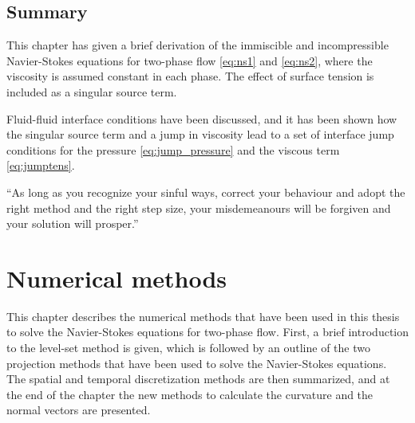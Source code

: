 \documentclass[11pt,b5paper,DIV=calc,BCOR1.3cm,headings=small,%
               footinclude=false,headsepline]{scrbook}
\begin{document}
\section{Summary}
This chapter has given a brief derivation of the immiscible and incompressible
Navier-Stokes equations for two-phase flow \eqref{eq:ns1} and \eqref{eq:ns2},
where the viscosity is assumed constant in each phase.  The effect of surface
tension is included as a singular source term.

Fluid-fluid interface conditions have been discussed, and it has been shown how
the singular source term and a jump in viscosity lead to a set of interface
jump conditions for the pressure \eqref{eq:jump_pressure} and the viscous term
\eqref{eq:jumptens}.

\begin{savequote}[7cm]
  ``As long as you recognize your sinful ways, correct your behaviour and adopt
  the right method and the right step size, your misdemeanours will be forgiven
  and your solution will prosper.''
\end{savequote}
\chapter{Numerical methods}
\label{chap:numerical-methods}
This chapter describes the numerical methods that have been used in this thesis
to solve the Navier-Stokes equations for two-phase flow.  First, a brief
introduction to the level-set method is given, which is followed by an outline
of the two projection methods that have been used to solve the Navier-Stokes
equations.  The spatial and temporal discretization methods are then
summarized, and at the end of the chapter the new methods to calculate the
curvature and the normal vectors are presented.
\end{document}
